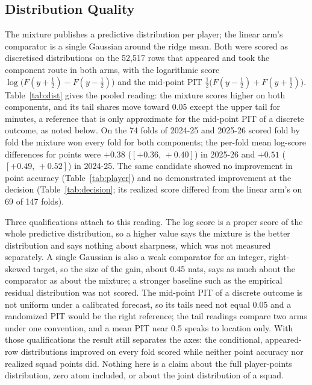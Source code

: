 \documentclass[11pt,a4paper]{article}
\newcommand{\ci}[2]{$[#1,\,#2]$}
\begin{document}
\subsection{Distribution Quality}
\label{sec:dist}

The mixture publishes a predictive distribution per player; the linear arm's comparator is a single Gaussian around the ridge mean. Both were scored as discretised distributions on the 52{,}517 rows that appeared and took the component route in both arms, with the logarithmic score $\log\big(F(y+\tfrac12)-F(y-\tfrac12)\big)$ and the mid-point PIT $\tfrac12\big(F(y-\tfrac12)+F(y+\tfrac12)\big)$. Table~\ref{tab:dist} gives the pooled reading: the mixture scores higher on both components, and its tail shares move toward 0.05 except the upper tail for minutes, a reference that is only approximate for the mid-point PIT of a discrete outcome, as noted below. On the 74 folds of 2024-25 and 2025-26 scored fold by fold the mixture won every fold for both components; the per-fold mean log-score differences for points were $+0.38$ (\ci{+0.36}{+0.40}) in 2025-26 and $+0.51$ (\ci{+0.49}{+0.52}) in 2024-25. The same candidate showed no improvement in point accuracy (Table~\ref{tab:player}) and no demonstrated improvement at the decision (Table~\ref{tab:decision}; its realized score differed from the linear arm's on 69 of 147 folds).

Three qualifications attach to this reading. The log score is a proper score of the whole predictive distribution, so a higher value says the mixture is the better distribution and says nothing about sharpness, which was not measured separately. A single Gaussian is also a weak comparator for an integer, right-skewed target, so the size of the gain, about 0.45 nats, says as much about the comparator as about the mixture; a stronger baseline such as the empirical residual distribution was not scored. The mid-point PIT of a discrete outcome is not uniform under a calibrated forecast, so its tails need not equal 0.05 and a randomized PIT \cite{gneitingranjan2013} would be the right reference; the tail readings compare two arms under one convention, and a mean PIT near 0.5 speaks to location only. With those qualifications the result still separates the axes: the conditional, appeared-row distributions improved on every fold scored while neither point accuracy nor realized squad points did. Nothing here is a claim about the full player-points distribution, zero atom included, or about the joint distribution of a squad.
\end{document}
